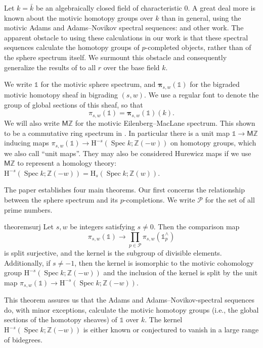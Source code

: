 \documentclass[11pt, oneside, dvipsnames, svgnames, table, final]{amsart}
\newcommand{\mathbx}[1]{\mathbb{#1}}
\theoremstyle{plain}
\theoremstyle{definition}
\theoremstyle{remark}
\newcommand{\Z}{\mathbx{Z}}
\newcommand{\ZZ}{\Z}
\newcommand{\spec}{\operatorname{Spec}}
\newcommand{\Spec}{\spec}
\newcommand{\sh}[1]{\mathcal{#1}}
\newcommand{\Hoh}{\mathrm{H}}
\newcommand{\bpi}{\bm{\pi}}
\newcommand{\<}[1]{{\langle}#1 {\rangle}}
\newcommand{\MZ}{\mathsf{M}\Z}
\newcommand{\one}{\mathbb{1}}
\begin{document}
Let $k=\bar k$ be an algebraically closed field of characteristic $0$. A great deal more is known about the motivic homotopy groups over $k$ than in general, using the motivic Adams and Adams--Novikov spectral sequences: \cite{Dugger2010, Isaksen2019, Isaksen2022, Isaksen2020, Stahn2021} and other work. The apparent obstacle to using these calculations in our work is that these spectral sequences calculate the homotopy groups of $p$-completed objects, rather than of the sphere spectrum itself. We surmount this obstacle and consequently generalize the results of \cite{Gant2025} to all $r$ over the base field $k$.

We write $\one$ for the motivic sphere spectrum, and $\bpi_{s,w}(\one)$ for the bigraded motivic homotopy sheaf in bigrading $(s,w)$. We use a regular font to denote the group of global sections of this sheaf, so that
\[ \pi_{s,w}(\one) = \bpi_{s,w}(\one)(k).\]
We will also write $\MZ$ for the motivic Eilenberg--MacLane spectrum. This shown to be a commutative ring spectrum in  \cite[Example 3.4]{Dundas2003}. In particular there is a unit map $\one \to \MZ$ inducing maps $\pi_{s,w}(\one) \to \Hoh^{-s}(\Spec k; \Z(-w))$ on homotopy groups, which we also call ``unit maps''. They may also be considered Hurewicz maps if we use $\MZ$ to represent a homology theory: $\Hoh^{-s}(\Spec k; \Z(-w)) = \Hoh_{s}(\Spec k ; \Z(w))$.

The paper establishes four main theorems. Our first concerns the relationship between the sphere spectrum and its $p$-completions. We write $\sh P$ for the set of all prime numbers. 
\begin{restatable}{theorem}{surj}\label{th:surjForSphere}
  Let $s,w$ be integers satisfying $s \neq 0$. Then the comparison map
  \[ \pi_{s,w}(\one) \to \prod_{p \in \sh P} \pi_{s,w}(\one^\wedge_p) \]
  is split surjective, and the kernel is the subgroup of divisible elements. Additionally, if $s \neq -1$, then the kernel is isomorphic to the motivic cohomology group $\Hoh^{-s}(\Spec k; \Z(-w))$ and the inclusion of the kernel is split by the unit map $\pi_{s,w}(\one) \to \Hoh^{-s}(\Spec k; \Z(-w))$.
\end{restatable}


This theorem assures us that the Adams and Adams--Novikov-spectral sequences do, with minor exceptions, calculate the motivic homotopy groups (i.e., the global sections of the homotopy sheaves) of $\one$ over $k$. The kernel $\Hoh^{-s}(\Spec k; \ZZ(-w))$ is either known or conjectured to vanish in a large range of bidegrees.
\end{document}
